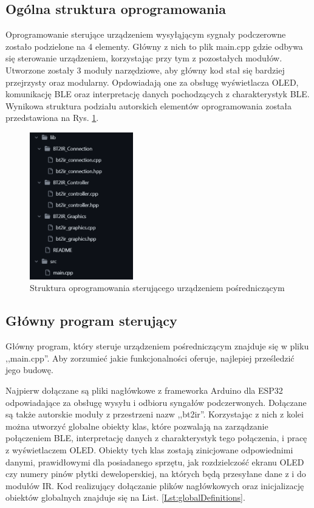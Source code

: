 \documentclass[12pt,twoside]{article}
\begin{document}
\subsection{Ogólna struktura oprogramowania}
Oprogramowanie sterujące urządzeniem wysyłąjącym sygnały podczerowne zostało podzielone na 4 elementy. Główny z nich to plik main.cpp gdzie odbywa się sterowanie urządzeniem, korzystając przy tym z pozostałych modułów. Utworzone zostały 3 moduły narzędziowe, aby główny kod stał się bardziej przejrzysty oraz modularny. Opdowiadają one za obsługę wyświetlacza OLED, komunikację BLE oraz interpretację danych pochodzących z charakterystyk BLE. Wynikowa struktura podziału autorskich elementów oprogramowania została przedstawiona na Rys. \ref*{Fig:codeStructure}.
\begin{figure}[ht]
   \centering
   \includegraphics[width=4.5cm]{images/codeStructure.png}
   \caption{Struktura oprogramowania sterującego urządzeniem pośredniczącym}
   \label{Fig:codeStructure}
\end{figure}

\subsection{Główny program sterujący}
Główny program, który steruje urządzeniem pośredniczącym znajduje się w pliku ,,main.cpp''. Aby zorzumieć jakie funkcjonalności oferuje, najlepiej prześledzić jego budowę.

Najpierw dołączane są pliki nagłówkowe z frameworka Arduino dla ESP32 odpowiadające za obsługę wysyłu i odbioru syngałów podczerwonych. Dołączane są także autorskie moduły z przestrzeni nazw ,,bt2ir''. Korzystając z nich z kolei można utworzyć globalne obiekty klas, które pozwalają na zarządzanie połączeniem BLE, interpretację danych z charakterystyk tego połączenia, i pracę z  wyświetlaczem OLED. Obiekty tych klas zostają zinicjowane odpowiednimi danymi, prawidłowymi dla posiadanego sprzętu, jak rozdzielczość ekranu OLED czy numery pinów płytki deweloperskiej, na których będą przesyłane dane z i do modułów IR. Kod realizujący dołączanie plików nagłówkowych oraz inicjalizację obiektów globalnych znajduje się na List. \ref{Lst:globalDefinitions}.
\end{document}
